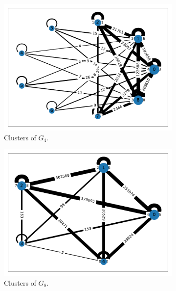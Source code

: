 \documentclass[12pt, a4paper]{article}
\begin{document}
  \begin{figure}
    \centering
    \begin{subfigure}[b]{0.3\textwidth}
      \centering
      \includegraphics[width=\textwidth]{figures/H-4-louvain.pdf}
      \caption{Clusters of $G_4$.}
      \label{fig:h-4}
    \end{subfigure}
    \hfill
    \begin{subfigure}[b]{0.3\textwidth}
      \centering
      \includegraphics[width=\textwidth]{figures/H-8-louvain.pdf}
      \caption{Clusters of $G_8$.}
      \label{fig:h-8}
    \end{subfigure}
    \hfill
    \begin{subfigure}[b]{0.3\textwidth}
      \centering

\end{subfigure}
\end{figure}
\end{document}

